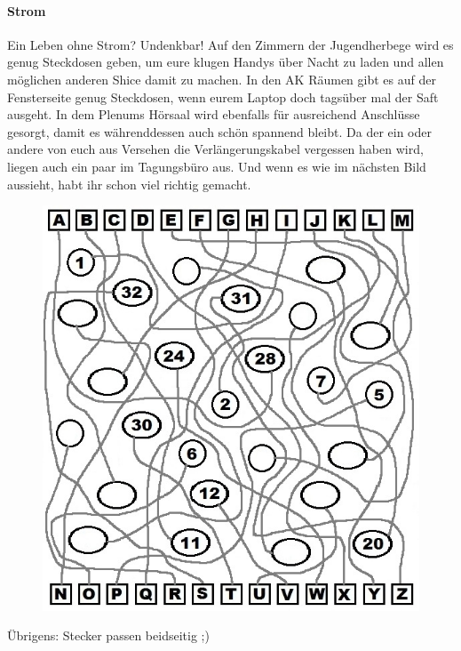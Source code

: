 \paragraph{Strom}
Ein Leben ohne Strom? Undenkbar! Auf den Zimmern der Jugendherbege wird es genug Steckdosen geben, um eure klugen Handys über Nacht zu laden und allen möglichen anderen Shice damit zu machen. In den AK Räumen gibt es auf der Fensterseite genug Steckdosen, wenn eurem Laptop doch tagsüber mal der Saft ausgeht. In dem Plenums Hörsaal wird ebenfalls für ausreichend Anschlüsse gesorgt, damit es währenddessen auch schön spannend bleibt. Da der ein oder andere von euch aus Versehen die Verlängerungskabel vergessen haben wird, liegen auch ein paar im Tagungsbüro aus. Und wenn es wie im nächsten Bild aussieht, habt ihr schon viel richtig gemacht.
\begin{figure}[h]
\centering
\includegraphics[width=\textwidth]{chapters/survive/kabel_raetsel.jpg}
\end{figure}
Übrigens: Stecker passen beidseitig ;)

